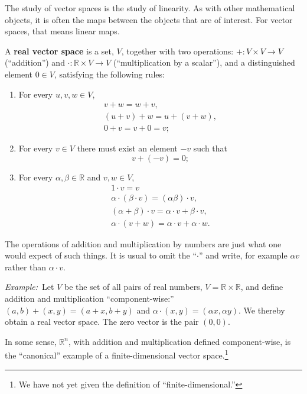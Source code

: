 \documentclass[10pt, a4paper, twocolumn]{article}
\newcommand{\R}{\mathbb{R}}
\newcommand{\defn}[1]{\textbf{#1}}
\newcommand{\eg}{\emph{Example:}\relax}
\begin{document}
The study of vector spaces is the study of linearity. As with other mathematical
objects, it is often the maps between the objects that are of interest. For
vector spaces, that means linear maps.

A \defn{real vector space} is a set, $V$, together with two operations: ${+}:V \times
V \to V$ (“addition”) and ${\cdot}:\R \times V \to V$ (“multiplication by a scalar”), and a
distinguished element $ 0\in V$, satisfying the following rules:
\begin{enumerate}
\item
  For every $u, v, w \in V$,
  \begin{equation*}
    \begin{gathered}
      v + w = w + v, \\
      (u + v) + w = u + (v + w), \\
      0 + v = v + 0 = v;
      \end{gathered}
  \end{equation*}
\item For every $v \in V$ there must exist an element $-v$ such that
  \begin{equation*}
    v + (-v) = 0; 
  \end{equation*}
\item For every $\alpha, \beta \in \R$ and $v, w \in V$,
  \begin{equation*}
    \begin{gathered}
      1 \cdot v = v \\
      \alpha \cdot (\beta \cdot v) = (\alpha \beta) \cdot v, \\
      (\alpha + \beta) \cdot v = \alpha \cdot v + \beta \cdot v, \\
      \alpha \cdot (v + w) = \alpha \cdot v + \alpha \cdot w.
    \end{gathered}
  \end{equation*}
\end{enumerate}
The operations of addition and multiplication by numbers are just what one would
expect of such things. It is usual to omit the “$\cdot$” and write, for example $\alpha
v$ rather than $\alpha \cdot v$.

\eg\ Let $V$ be the set of all pairs of real numbers, $V = \R \times \R$, and define
addition and multiplication “component-wise:” $(a, b) + (x, y) = (a + x, b + y)$
and $\alpha \cdot (x, y) = (\alpha x, \alpha y)$. We thereby obtain a real vector space. The zero
vector is the pair $(0, 0)$.

In some sense, $\R^n$, with addition and multiplication defined component-wise,
is the “canonical” example of a finite-dimensional vector space.\footnote{We
  have not yet given the definition of “finite-dimensional.”}
\end{document}
